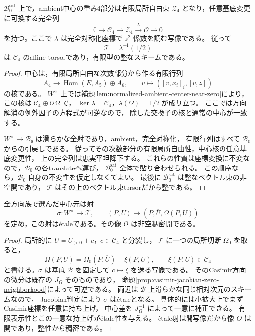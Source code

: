 \begin{lemma}[有限な規格化中心torsor]
\label{lem:intrinsic-normalized-center-torsor}
$\mathcal B_0^{\mathrm{sat}}$ 上で，ambient中心の重み4部分は有限局所自由束
$\mathcal Z_4$ となり，任意基底変更に可換する完全列
\[
 0\longrightarrow\mathcal C_4\longrightarrow\mathcal Z_4
       \xrightarrow{\lambda}\mathcal O\longrightarrow0
\]
を持つ。ここで $\lambda$ は完全対称化座標で $z^2$ 係数を読む写像である。
従って
\[
                     \mathcal T=\lambda^{-1}(1/2)
\]
は $\mathcal C_4$ のaffine torsorであり，有限型の整なスキームである。
\end{lemma}
\begin{proof}
中心は，有限局所自由な次数部分から作る有限行列
\[
 A_4\longrightarrow
     \operatorname{Hom}(E,A_5)\oplus A_6,
 \qquad v\longmapsto([v,x_i]_i,[v,z])
\]
の核である。
$W^\times$ 上では補題\ref{lem:normalized-ambient-center-near-zero}により，
この核は $\mathcal C_4\oplus\mathcal O\Omega$ で，
$\ker\lambda=\mathcal C_4$，$\lambda(\Omega)=1/2$ が成り立つ。
ここでは方向解消の例外因子の方程式が可逆なので，
除した交換子の核と通常の中心が一致する。

$W^\times\to\mathcal B_0$ は滑らかな全射であり，ambient，完全対称化，
有限行列はすべて $\mathcal B_0$ からの引戻しである。
従ってその次数部分の有限局所自由性，中心核の任意基底変更性，
上の完全列は忠実平坦降下する。
これらの性質は座標変換に不変なので，$\mathcal B_0$ の各translateへ運び，
$\mathcal B_0^{\mathrm{sat}}$ 全体で貼り合わせられる。
この順序なら，$\mathcal B_0$ 自身の不変性を仮定しなくてよい。
最後に $\mathcal B_0^{\mathrm{sat}}$ は整なベクトル束の非空開であり，
$\mathcal T$ はその上のベクトル束torsorだから整である。
\end{proof}

\begin{lemma}[中心元を係数とする写像]
\label{lem:global-center-parameter-etale}
全方向族で選んだ中心元は射
\[
 \sigma:W^\times\longrightarrow\mathcal T,
 \qquad(P,U)\longmapsto(P,\overline U,\Omega(P,U))
\]
を定め，この射は\'{e}taleである。その像 $O$ は非空稠密開である。
\end{lemma}
\begin{proof}
局所的に $U=U_{>0}+c$，$c\in\mathcal C_4$ と分裂し，
$\mathcal T$ に一つの局所切断 $\Omega_0$ を取ると，
\[
 \Omega(P,U)=\Omega_0(P,\overline U)+\xi(P,U),\qquad
                                  \xi(P,U)\in\mathcal C_4
\]
と書ける。$\sigma$ は基底 $\mathcal B$ を固定して $c\mapsto\xi$ を送る写像である。
そのCasimir方向の微分は既存の $J_\Omega$ そのものであり，
命題\ref{prop:casimir-jacobian-zero-neighborhood}によって可逆である。
両辺は $\mathcal B$ 上滑らかな同じ相対次元のスキームなので，
Jacobian判定により $\sigma$ は\'{e}taleとなる。
具体的には小拡大上でまずCasimir座標を任意に持ち上げ，
中心差を $J_\Omega^{-1}$ によって一意に補正できる。
有限表示性とこの一意な持上げが\'{e}tale性を与える。
\'{e}tale射は開写像だから像 $O$ は開であり，整性から稠密である。
\end{proof}

